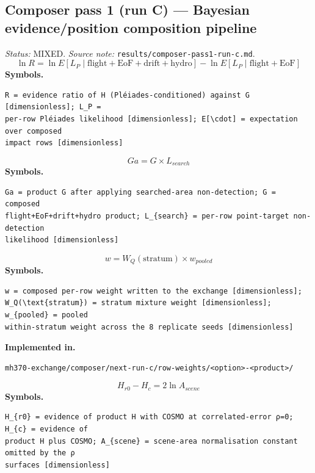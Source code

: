 \documentclass[11pt,a4paper]{article}
\begin{document}
\subsection{Composer pass 1 (run C) — Bayesian evidence/position composition pipeline}
\noindent\textit{Status:} MIXED. \textit{Source note:} \texttt{results/composer-pass1-run-c.md}.
\medskip
\begin{equation}
\ln R = \ln E[L_P \mid \text{flight} + \text{EoF} + \text{drift} + \text{hydro}] - \ln E[L_P \mid \text{flight} + \text{EoF}]
\end{equation}
\noindent\textbf{Symbols.}
\begin{verbatim}
R = evidence ratio of H (Pléiades-conditioned) against G [dimensionless]; L_P =
per-row Pléiades likelihood [dimensionless]; E[\cdot] = expectation over composed
impact rows [dimensionless]
\end{verbatim}
\medskip
\begin{equation}
Ga = G \times L_{search}
\end{equation}
\noindent\textbf{Symbols.}
\begin{verbatim}
Ga = product G after applying searched-area non-detection; G = composed
flight+EoF+drift+hydro product; L_{search} = per-row point-target non-detection
likelihood [dimensionless]
\end{verbatim}
\medskip
\begin{equation}
w = W_Q(\text{stratum}) \times w_{pooled}
\end{equation}
\noindent\textbf{Symbols.}
\begin{verbatim}
w = composed per-row weight written to the exchange [dimensionless];
W_Q(\text{stratum}) = stratum mixture weight [dimensionless]; w_{pooled} = pooled
within-stratum weight across the 8 replicate seeds [dimensionless]
\end{verbatim}
\noindent\textbf{Implemented in.}
\begin{verbatim}
mh370-exchange/composer/next-run-c/row-weights/<option>-<product>/
\end{verbatim}
\medskip
\begin{equation}
H_{r0} - H_{c} = 2\ln A_{scene}
\end{equation}
\noindent\textbf{Symbols.}
\begin{verbatim}
H_{r0} = evidence of product H with COSMO at correlated-error ρ=0; H_{c} = evidence of
product H plus COSMO; A_{scene} = scene-area normalisation constant omitted by the ρ
surfaces [dimensionless]
\end{verbatim}
\medskip
\end{document}
